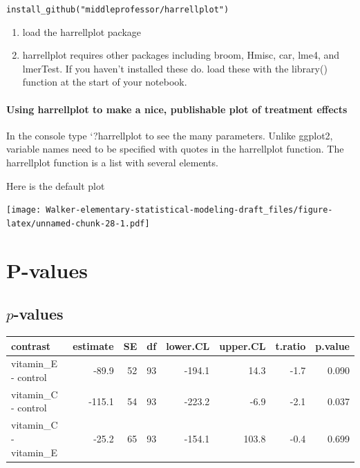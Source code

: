 \documentclass[]{book}
\newenvironment{Shaded}{\begin{snugshade}}{\end{snugshade}}
\newcommand{\KeywordTok}[1]{\textcolor[rgb]{0.13,0.29,0.53}{\textbf{#1}}}
\newcommand{\DataTypeTok}[1]{\textcolor[rgb]{0.13,0.29,0.53}{#1}}
\newcommand{\StringTok}[1]{\textcolor[rgb]{0.31,0.60,0.02}{#1}}
\newcommand{\CommentTok}[1]{\textcolor[rgb]{0.56,0.35,0.01}{\textit{#1}}}
\newcommand{\OperatorTok}[1]{\textcolor[rgb]{0.81,0.36,0.00}{\textbf{#1}}}
\newcommand{\NormalTok}[1]{#1}
\providecommand{\tightlist}{%
  \setlength{\itemsep}{0pt}\setlength{\parskip}{0pt}}
\begin{document}
\texttt{install\_github("middleprofessor/harrellplot")}

\begin{enumerate}
\def\labelenumi{\arabic{enumi}.}
\setcounter{enumi}{2}
\tightlist
\item
  load the harrellplot package
\item
  harrellplot requires other packages including broom, Hmisc, car, lme4,
  and lmerTest. If you haven't installed these do. load these with the
  library() function at the start of your notebook.
\end{enumerate}

\subsubsection{Using harrellplot to make a nice, publishable plot of
treatment
effects}\label{using-harrellplot-to-make-a-nice-publishable-plot-of-treatment-effects}

In the console type `?harrellplot to see the many parameters. Unlike
ggplot2, variable names need to be specified with quotes in the
harrellplot function. The harrellplot function is a list with several
elements.

Here is the default plot

\begin{Shaded}
\end{Shaded}

\texttt{[image: Walker-elementary-statistical-modeling-draft\_files/figure-latex/unnamed-chunk-28-1.pdf]}

\chapter{P-values}\label{p-values}

\section{\texorpdfstring{\(p\)-values}{p-values}}\label{p-values}

\begin{tabular}{l|r|r|r|r|r|r|r}
\hline
contrast & estimate & SE & df & lower.CL & upper.CL & t.ratio & p.value\\
\hline
vitamin\_E - control & -89.9 & 52 & 93 & -194.1 & 14.3 & -1.7 & 0.090\\
\hline
vitamin\_C - control & -115.1 & 54 & 93 & -223.2 & -6.9 & -2.1 & 0.037\\
\hline
vitamin\_C - vitamin\_E & -25.2 & 65 & 93 & -154.1 & 103.8 & -0.4 & 0.699\\
\hline
\end{tabular}
\end{document}
